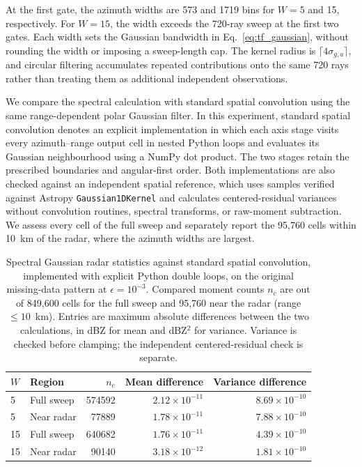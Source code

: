 \documentclass[a4paper,fleqn]{cas-sc}
\begin{document}
At the first gate, the azimuth widths are 573 and 1719 bins for $W=5$ and 15, respectively. For $W=15$, the width exceeds the 720-ray sweep at the first two gates. Each width sets the Gaussian bandwidth in Eq.~\ref{eq:tf_gaussian}, without rounding the width or imposing a sweep-length cap. The kernel radius is $\lceil4\sigma_{g,a}\rceil$, and circular filtering accumulates repeated contributions onto the same 720 rays rather than treating them as additional independent observations.

We compare the spectral calculation with standard spatial convolution using the same range-dependent polar Gaussian filter. In this experiment, standard spatial convolution denotes an explicit implementation in which each axis stage visits every azimuth--range output cell in nested Python loops and evaluates its Gaussian neighbourhood using a NumPy dot product. The two stages retain the prescribed boundaries and angular-first order. Both implementations are also checked against an independent spatial reference, which uses samples verified against Astropy \texttt{Gaussian1DKernel} and calculates centered-residual variances without convolution routines, spectral transforms, or raw-moment subtraction. We assess every cell of the full sweep and separately report the 95,760 cells within 10~km of the radar, where the azimuth widths are largest.


\begin{table}[htbp]
	\centering
	\caption{Spectral Gaussian radar statistics against standard spatial convolution, implemented with explicit Python double loops, on the original missing-data pattern at $\epsilon=10^{-3}$. Compared moment counts $n_c$ are out of 849,600 cells for the full sweep and 95,760 near the radar (range $\leq10$~km). Entries are maximum absolute differences between the two calculations, in dBZ for mean and dBZ$^2$ for variance. Variance is checked before clamping; the independent centered-residual check is separate.}
	\label{tab:radar_statistics}
	\small
	\setlength{\tabcolsep}{4pt}
	\begin{tabular}{@{}llrrr@{}}
		\toprule
		$W$ & Region & $n_c$ & Mean difference & Variance difference \\
		\midrule
		5 & Full sweep & 574592 & $2.12\times10^{-11}$ & $8.69\times10^{-10}$ \\
		5 & Near radar & 77889 & $1.78\times10^{-11}$ & $7.88\times10^{-10}$ \\
		15 & Full sweep & 640682 & $1.76\times10^{-11}$ & $4.39\times10^{-10}$ \\
		15 & Near radar & 90140 & $3.18\times10^{-12}$ & $1.81\times10^{-10}$ \\
		\bottomrule
	\end{tabular}
\end{table}
\end{document}
